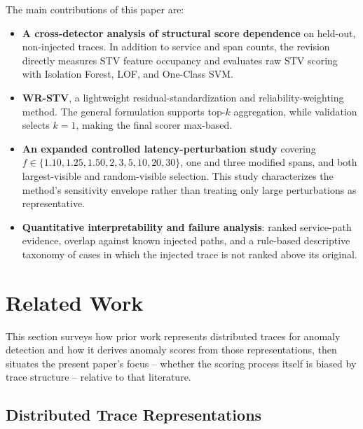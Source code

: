 \documentclass[informatics,article,submit,moreauthors]{Definitions/mdpi}
\newcommand{\rev}[1]{{\color{revisionblue}#1}}
\begin{document}
The main contributions of this paper are:
\begin{itemize}
    \item \rev{\textbf{A cross-detector analysis of structural score dependence}
on held-out, non-injected traces. In addition to service and span counts, the
revision directly measures STV feature occupancy and evaluates raw STV scoring
with Isolation Forest, LOF, and One-Class SVM.}

    \item \rev{\textbf{WR-STV}, a lightweight residual-standardization and
reliability-weighting method. The general formulation supports top-$k$
aggregation, while validation selects $k=1$, making the final scorer
max-based.}

    \item \rev{\textbf{An expanded controlled latency-perturbation study}
covering $f\in\{1.10,1.25,1.50,2,3,5,10,20,30\}$, one and three modified
spans, and both largest-visible and random-visible selection. This study
characterizes the method's sensitivity envelope rather than treating only
large perturbations as representative.}

    \item \textbf{Quantitative interpretability and failure analysis}:
ranked service-path evidence, overlap against known injected paths, and a
rule-based descriptive taxonomy of cases in which the injected trace is not
ranked above its original.
\end{itemize}


\section{Related Work}
\label{sec:related-work}

\rev{This section surveys how prior work represents distributed traces for
anomaly detection and how it derives anomaly scores from those
representations, then situates the present paper's focus -- whether the
scoring process itself is biased by trace structure -- relative to that
literature.}

\subsection{Distributed Trace Representations}
\end{document}
